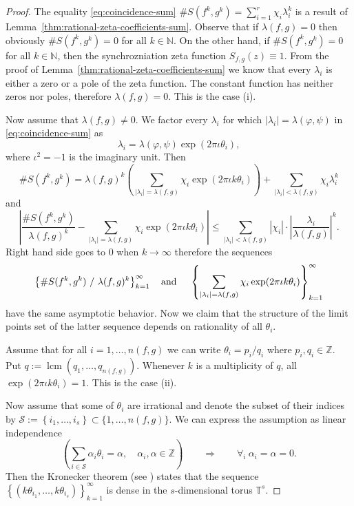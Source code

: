 \documentclass[oneside]{amsart}
\def\N{\mathbb{N}}
\def\Z{\mathbb{Z}}
\begin{document}
\begin{proof}
  The equality \eqref{eq:coincidence-sum}  $\# S(f^k, g^k) = \sum_{i=1}^{r} \chi_i \lambda_i^k$
  is a result of Lemma~\ref{thm:rational-zeta-coefficients-sum}.
  Observe that if $\lambda(f,g) = 0$ then obviously $\#S(f^k, g^k) = 0$ for all $k \in \N$.
  On the other hand, if $\#S(f^k, g^k) = 0$ for all $k \in \N$, then the synchrozniation zeta function
  $S_{f,g}(z) \equiv 1$. From the proof of Lemma~\ref{thm:rational-zeta-coefficients-sum} we know
  that every $\lambda_i$ is either a zero or a pole of the zeta function.
  The constant function has neither zeros nor poles, therefore $\lambda(f,g) = 0$.
  This is the case (i).

  Now assume that $\lambda(f,g) \neq 0$.
  We factor every $\lambda_i$ for which $|\lambda_i| = \lambda(\varphi, \psi)$
  in \eqref{eq:coincidence-sum} as
  $$\lambda_i = \lambda(\varphi, \psi) \exp(2\pi\iota\theta_i),$$
  where $\iota^2 = -1$ is the imaginary unit.
  Then
  \[
    \# S(f^k, g^k) = \lambda(f, g)^k
      \left( \sum_{|\lambda_i| = \lambda(f, g)} \chi_i \exp(2\pi\iota k \theta_i) \right)
      + \sum_{|\lambda_i| < \lambda(f, g)} \chi_i \lambda_i^k
  \]
  and
  \[
    \left| \frac{\# S(f^k, g^k)}{\lambda(f, g)^k}
      - \sum_{|\lambda_i| = \lambda(f, g)} \chi_i \exp(2\pi\iota k \theta_i) \right|
    \leq \sum_{|\lambda_i| < \lambda(f, g)} |\chi_i|
      \cdot \left| \frac{\lambda_i}{\lambda(f, g)} \right|^k.
  \]
  Right hand side goes to $0$ when $k \to \infty$ therefore the sequences
  \[
    \left\{ \# S(f^k, g^k) \ / \ \lambda(f, g)^k \right\}_{k=1}^\infty
    \mbox{\quad and \quad }
    \left\{ \sum_{|\lambda_i| = \lambda(f, g)} \chi_i \exp(2\pi\iota k \theta_i) \right\}_{k=1}^\infty
  \]
  have the same asymptotic behavior.
  Now we claim that the structure of the limit points set of the latter sequence
  depends on rationality of all $\theta_i$.

  Assume that for all $i = 1, \dots, n(f, g)$ we can write $\theta_i = p_i / q_i$ where $p_i, q_i \in \Z$.
  Put $q := \operatorname{lcm}(q_1, \dots, q_{n(f, g)})$.
  Whenever $k$ is a multiplicity of $q$, all $\exp(2\pi\iota k \theta_i) = 1$.
  This is the case (ii).

  Now assume that some of $\theta_i$ are irrational and denote the subset of their indices
  by $\mathcal{S} := \left\{ i_1, \dots, i_s \right\} \subset \{1, \dots, n(f, g)\}$.
  We can express the assumption as linear independence
  \[
    \left( \sum_{i \in \mathcal{S}} \alpha_i \theta_i = \alpha, \quad \alpha_i, \alpha \in \Z \right) \qquad
    \Longrightarrow \qquad \forall_i \ \alpha_i = \alpha = 0.
  \]
  Then the Kronecker theorem (see \cite[Theorem VIII.6]{Cha}) states that the sequence
  $\left\{ (k\theta_{i_1}, \dots, k\theta_{i_s}) \right\}_{k=1}^\infty$ is dense
  in the $s$-dimensional torus $\mathbb{T}^s$.


\end{proof}
\end{document}
